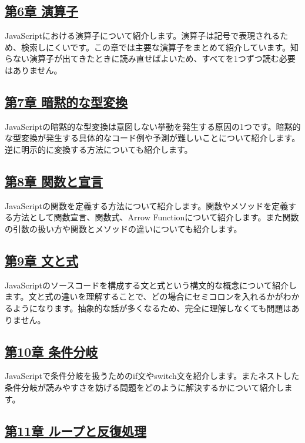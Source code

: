 \subsection*{\hyperlink{operator}{第6章 演算子}}

JavaScriptにおける演算子について紹介します。演算子は記号で表現されるため、検索しにくいです。この章では主要な演算子をまとめて紹介しています。知らない演算子が出てきたときに読み直せばよいため、すべてを1つずつ読む必要はありません。

\subsection*{\hyperlink{implicit-coercion}{第7章 暗黙的な型変換}}

JavaScriptの暗黙的な型変換は意図しない挙動を発生する原因の1つです。暗黙的な型変換が発生する具体的なコード例や予測が難しいことについて紹介します。逆に明示的に変換する方法についても紹介します。

\subsection*{\hyperlink{function-and-declaration}{第8章 関数と宣言}}

JavaScriptの関数を定義する方法について紹介します。関数やメソッドを定義する方法として関数宣言、関数式、Arrow
Functionについて紹介します。また関数の引数の扱い方や関数とメソッドの違いについても紹介します。

\subsection*{\hyperlink{statement-and-expression}{第9章 文と式}}

JavaScriptのソースコードを構成する文と式という構文的な概念について紹介します。文と式の違いを理解することで、どの場合にセミコロンを入れるかがわかるようになります。抽象的な話が多くなるため、完全に理解しなくても問題はありません。

\subsection*{\hyperlink{conditional-branch}{第10章 条件分岐}}

JavaScriptで条件分岐を扱うためのif文やswitch文を紹介します。またネストした条件分岐が読みやすさを妨げる問題をどのように解決するかについて紹介します。

\subsection*{\hyperlink{loop-and-iteration}{第11章 ループと反復処理}}

